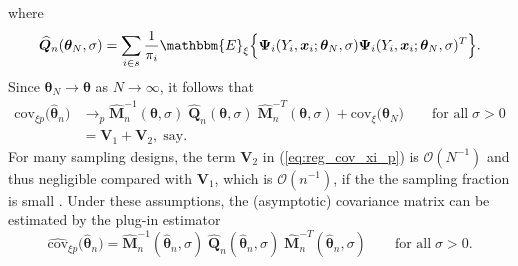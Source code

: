 \documentclass[a4paper,oneside,11pt,DIV=12]{scrartcl}
\theoremstyle{remark}
\begin{document}
\noindent where
\begin{equation*}
    \widehat{\bm Q}_n(\bm \theta_N, \sigma) = \sum_{i \in s} \frac{1}{\pi_i} \mathbbm{E}_{\xi} \Big\{ \bm \Psi_i(Y_i, \bm x_i;\bm \theta_N, \sigma) \bm \Psi_i(Y_i, \bm x_i;\bm \theta_N, \sigma)^T \Big\}.
\end{equation*}
\noindent Since $\bm \theta_N \rightarrow \bm \theta$ as $N \rightarrow \infty$, it follows that
\begin{align}\label{eq:reg_cov_xi_p}
    \mathrm{cov}_{\xi p}\big( \widehat{\bm \theta}_n \big) &\rightarrow_p \widehat{\bm M}_n^{-1}(\bm \theta, \sigma) \; \widehat{\bm Q}_n(\bm \theta, \sigma) \; \widehat{\bm M}_n^{-T}(\bm \theta, \sigma) +\mathrm{cov}_{\xi} \big( \bm \theta_N\big) \qquad \text{for all} \; \sigma > 0 \nonumber \\
    & = \bm V_1 + \bm V_2, \;\text{say}.
\end{align}
\noindent For many sampling designs, the term $\bm V_2$ in (\ref{eq:reg_cov_xi_p}) is $\mathcal{O}(N^{-1})$ and thus negligible compared with $\bm V_1$, which is $\mathcal{O}(n^{-1})$, if the the sampling fraction is small \citep{binder_roberts_2009}. Under these assumptions, the (asymptotic) covariance matrix can be estimated by the plug-in estimator
\begin{equation}\label{eq:reg_cov_est}
    \widehat{\mathrm{cov}}_{\xi p}\big( \widehat{\bm \theta}_n \big) = \widehat{\bm M}_n^{-1}(\widehat{\bm \theta}_n, \sigma) \; \widehat{\bm Q}_n(\widehat{\bm \theta}_n, \sigma) \; \widehat{\bm M}_n^{-T}(\widehat{\bm \theta}_n, \sigma) \qquad \text{for all} \; \sigma > 0.
\end{equation}
\end{document}
